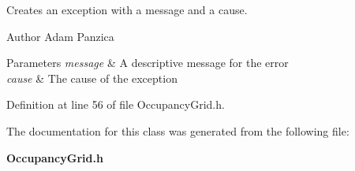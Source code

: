 \-Creates an exception with a message and a cause. 

\begin{DoxyAuthor}{\-Author}
\-Adam \-Panzica 
\end{DoxyAuthor}

\begin{DoxyParams}{\-Parameters}
{\em message} & \-A descriptive message for the error \\
\hline
{\em cause} & \-The cause of the exception \\
\hline
\end{DoxyParams}


\-Definition at line 56 of file \-Occupancy\-Grid.\-h.



\-The documentation for this class was generated from the following file\-:\begin{DoxyCompactItemize}
\item 
{\bf \-Occupancy\-Grid.\-h}\end{DoxyCompactItemize}
